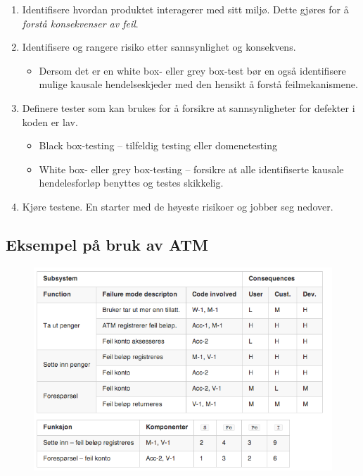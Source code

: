 \begin{enumerate}[1.]
\item
  Identifisere hvordan produktet interagerer med sitt miljø. Dette
  gjøres for å \emph{forstå konsekvenser av feil}.
\item
  Identifisere og rangere risiko etter sannsynlighet og konsekvens.
  \begin{itemize}
  \item
    Dersom det er en white box- eller grey box-test bør en også
    identifisere mulige kausale hendelseskjeder med den hensikt å forstå
    feilmekanismene.
  \end{itemize}
\item
  Definere tester som kan brukes for å forsikre at sannsynligheter for
  defekter i koden er lav.
  \begin{itemize}
  \item
    Black box-testing -- tilfeldig testing eller domenetesting
  \item
    White box- eller grey box-testing -- forsikre at alle identifiserte
    kausale hendelesforløp benyttes og testes skikkelig.
  \end{itemize}
\item
  Kjøre testene. En starter med de høyeste risikoer og jobber seg
  nedover.
\end{enumerate}
\subsection{Eksempel på bruk av ATM}

\begin{figure}[htbp]
\centering
\includegraphics{Forelesning 08/img/ATM-ex.png}
\caption{}
\end{figure}

